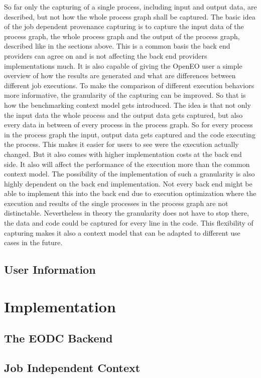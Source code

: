 \documentclass[draft,final]{vutinfth} %
\begin{document}
So far only the capturing of a single process, including input and output data, are described, but not how the whole process graph shall be captured. The basic idea of the job dependent provenance capturing is to capture the input data of the process graph, the whole process graph and the output of the process graph, described like in the sections above. This is a common basis the back end providers can agree on and is not affecting the back end providers implementations much. It is also capable of giving the OpenEO user a simple overview of how the results are generated and what are differences between different job executions. 
To make the comparison of different execution behaviors more informative, the granularity of the capturing can be improved. So that is how the benchmarking context model gets introduced. The idea is that not only the input data the whole process and the output data gets captured, but also every data in between of every process in the process graph. So for every process in the process graph the input, output data gets captured and the code executing the process. This makes it easier for users to see were the execution actually changed. But it also comes with higher implementation costs at the back end side. It also will affect the performance of the execution more than the common context model. The possibility of the implementation of such a granularity is also highly dependent on the back end implementation. Not every back end might be able to implement this into the back end due to execution optimization where the execution and results of the single  processes in the process graph are not distinctable. Nevertheless in theory the granularity does not have to stop there, the data and code could be captured for every line in the code. This flexibility of capturing makes it also a context model that  can be adapted to different use cases in the future. 
\section{User Information}

\chapter{Implementation}
\section{The EODC Backend}
\section{Job Independent Context}
\end{document}
